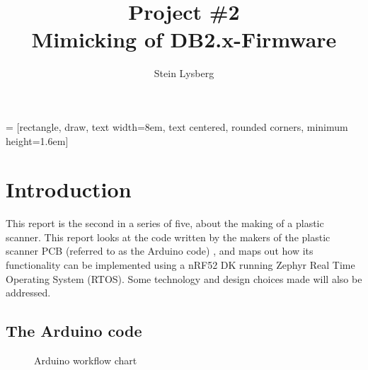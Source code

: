 \documentclass[12pt, a4paper]{article}
\title{
    Project \#2\\
    \large Mimicking of DB2.x-Firmware\\
}
\author{
    Stein Lysberg
}
\begin{document}
     = [rectangle, draw, text width=8em, text centered, rounded      corners, minimum height=1.6em]

    \maketitle
    \tableofcontents
    \thispagestyle{empty}
    \addtocounter{page}{-1}
    \clearpage
    \section{Introduction}

        This report is the second in a series of five, about the making of a plastic scanner. This report looks at
        the code written by the makers of the plastic scanner PCB (referred to as the Arduino code) \cite{DB23}, and maps out how its functionality can be implemented
        using a nRF52 DK running Zephyr Real Time Operating System (RTOS). Some technology and design choices made will also be addressed.

        \subsection{The Arduino code}

            \begin{figure}
            \centering
            \vspace{-30pt}
            \caption{Arduino workflow chart}
            \label{fig:arduinoflow}
            \end{figure}
\end{document}
